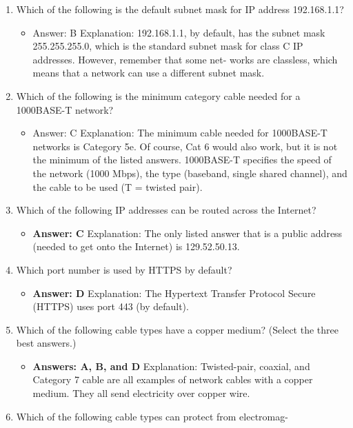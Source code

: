 \documentclass{article}
\begin{document}
\begin{enumerate}
\begin{itemize}
    \end{itemize}
    \item Which of the following is the default subnet mask for IP address
192.168.1.1?
    \begin{itemize}
        \item Answer: B
Explanation: 192.168.1.1, by default, has the subnet mask 255.255.255.0, which is the
standard subnet mask for class C IP addresses. However, remember that some net-
works are classless, which means that a network can use a different subnet mask.
    \end{itemize}
    \item Which of the following is the minimum category cable needed for a
1000BASE-T network?
    \begin{itemize}
        \item Answer: C
Explanation: The minimum cable needed for 1000BASE-T networks is Category 5e.
Of course, Cat 6 would also work, but it is not the minimum of the listed answers.
1000BASE-T specifies the speed of the network (1000 Mbps), the type (baseband,
single shared channel), and the cable to be used (T = twisted pair).
    \end{itemize}
    \item Which of the following IP addresses can be routed across
the Internet?
    \begin{itemize}
        \item \textbf{Answer: C}
Explanation: The only listed answer that is a public address (needed to get onto the
Internet) is 129.52.50.13.
    \end{itemize}
    \item Which port number is used by HTTPS by default?
    \begin{itemize}
        \item \textbf{Answer: D}
Explanation: The Hypertext Transfer Protocol Secure (HTTPS) uses port 443 (by
default).
    \end{itemize}
    \item Which of the following cable types have a copper medium?
(Select the three best answers.)
    \begin{itemize}
        \item\textbf{ Answers: A, B, and D}
Explanation: Twisted-pair, coaxial, and Category 7 cable are all examples of network
cables with a copper medium. They all send electricity over copper wire.
    \end{itemize}
    \item Which of the following cable types can protect from electromag-

\end{enumerate}
\end{document}
